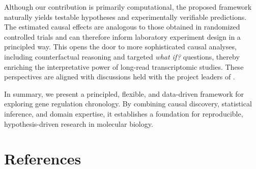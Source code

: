 \documentclass[
]{article}
\theoremstyle{definition}
\theoremstyle{remark}
\begin{document}
Although our contribution is primarily computational, the proposed
framework naturally yields testable hypotheses and experimentally
verifiable predictions. The estimated causal effects are analogous to
those obtained in randomized controlled trials and can therefore inform
laboratory experiment design in a principled way. This opens the door to
more sophisticated causal analyses, including counterfactual reasoning
and targeted \emph{what if?} questions, thereby enriching the
interpretative power of long-read transcriptomic studies. These
perspectives are aligned with discussions held with the project leaders
of .

In summary, we present a principled, flexible, and data-driven framework
for exploring gene regulation chronology. By combining causal discovery,
statistical inference, and domain expertise, it establishes a foundation
for reproducible, hypothesis-driven research in molecular biology.

\section*{References}\label{references}
\end{document}
